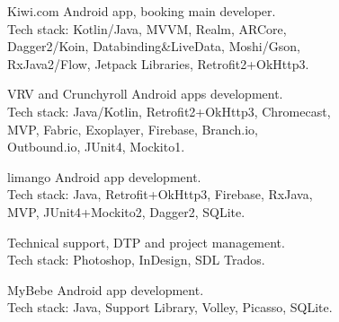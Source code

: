 \documentclass[12pt, a4paper]{article}
\begin{document}
\begin{minipage}[t]{0.6\textwidth}
    
    \begin{sectionBody}
        \> Kiwi.com Android app, booking main developer. \\
        \> Tech stack: Kotlin/Java, MVVM, Realm, ARCore, \\
        \> Dagger2/Koin, Databinding\&LiveData, Moshi/Gson, \\
        \> RxJava2/Flow, Jetpack Libraries, Retrofit2+OkHttp3. \\
    \end{sectionBody}
    
    \begin{sectionBody}
        \> VRV and Crunchyroll Android apps development. \\
        \> Tech stack: Java/Kotlin, Retrofit2+OkHttp3, Chromecast, \\
        \> MVP, Fabric, Exoplayer, Firebase, Branch.io, \\
        \> Outbound.io, JUnit4, Mockito1. \\
    \end{sectionBody}
    
    \begin{sectionBody}
        \> limango Android app development. \\
        \> Tech stack: Java, Retrofit+OkHttp3, Firebase, RxJava, \\
        \> MVP, JUnit4+Mockito2, Dagger2, SQLite. \\
    \end{sectionBody}
    
    \begin{sectionBody}
        \> Technical support, DTP and project management. \\
        \> Tech stack: Photoshop, InDesign, SDL Trados. \\
    \end{sectionBody}
     
    \begin{sectionBody}
        \> MyBebe Android app development. \\
        \> Tech stack: Java, Support Library, Volley, Picasso, SQLite. \\
    \end{sectionBody}
    

\end{minipage}
\end{document}
